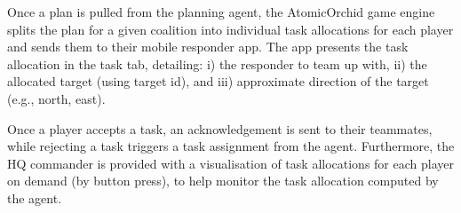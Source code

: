 Once a plan is pulled from the planning agent, the AtomicOrchid game engine splits the plan for a given coalition into individual task allocations for each player and sends them to their mobile responder app. The app presents the task allocation in the task tab, detailing: i) the responder to team up with, ii) the allocated target (using target id), and iii) approximate direction of the target (e.g., north, east). 

Once a player accepts a task, an acknowledgement is sent to their teammates, while rejecting a task triggers a task assignment from the agent. Furthermore, the HQ commander is provided with a visualisation of task allocations for each player on demand (by button press), to help monitor the task allocation computed by the agent.

